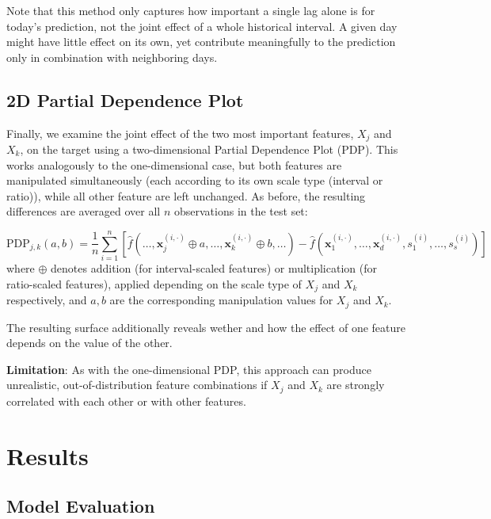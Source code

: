 \documentclass[
]{krantz}
\begin{document}
Note that this method only captures how important a single lag alone is for today's prediction, not the joint effect of a whole historical interval. A given day might have little effect on its own, yet contribute meaningfully to the prediction only in combination with neighboring days.

\subsection{2D Partial Dependence Plot}\label{d-partial-dependence-plot}

Finally, we examine the joint effect of the two most important features, \(X_j\) and \(X_k\), on the target using a two-dimensional Partial Dependence Plot (PDP). This works analogously to the one-dimensional case, but both features are manipulated simultaneously (each according to its own scale type (interval or ratio)), while all other feature are left unchanged. As before, the resulting differences are averaged over all \(n\) observations in the test set:

\[
\mathrm{PDP}_{j, k}(a, b) = \frac{1}{n}\sum_{i=1}^n \left[\hat f \left(\dots, \boldsymbol x_j^{(i, \cdot)} \oplus a, \dots, \boldsymbol x_k^{(i, \cdot)} \oplus b,\dots \right) - \hat f \left(\boldsymbol x_1^{(i, \cdot)}, \dots, \boldsymbol x_d^{(i, \cdot)}, s_1^{(i)},\dots, s_s^{(i)} \right)\right]
\]
where \(\oplus\) denotes addition (for interval-scaled features) or multiplication (for ratio-scaled features), applied depending on the scale type of \(X_j\) and \(X_k\) respectively, and \(a, b\) are the corresponding manipulation values for \(X_j\) and \(X_k\).

The resulting surface additionally reveals wether and how the effect of one feature depends on the value of the other.

\textbf{Limitation}: As with the one-dimensional PDP, this approach can produce unrealistic, out-of-distribution feature combinations if \(X_j\) and \(X_k\) are strongly correlated with each other or with other features.

\newpage

\section{Results}\label{results-4}

\subsection{Model Evaluation}\label{model-evaluation}
\end{document}

